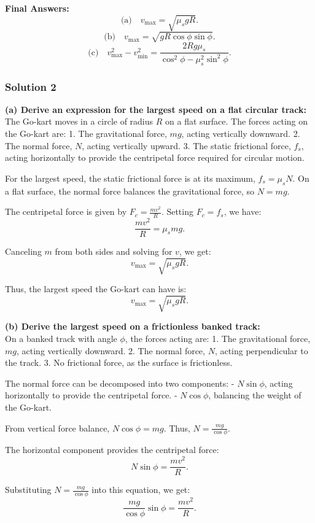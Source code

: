 \documentclass{article}
\begin{document}
\textbf{Final Answers:}
\[
\text{(a)} \quad v_{\text{max}} = \sqrt{\mu_s g R}.
\]
\[
\text{(b)} \quad v_{\text{max}} = \sqrt{g R \cos\phi \sin\phi}.
\]
\[
\text{(c)} \quad v_{\text{max}}^2 - v_{\text{min}}^2 = \frac{2Rg \mu_s}{\cos^2\phi - \mu_s^2 \sin^2\phi}.
\]

\subsubsection{Solution 2}

\textbf{(a) Derive an expression for the largest speed on a flat circular track:} \\[1em]
The Go-kart moves in a circle of radius $R$ on a flat surface. The forces acting on the Go-kart are:
1. The gravitational force, $mg$, acting vertically downward.
2. The normal force, $N$, acting vertically upward.
3. The static frictional force, $f_s$, acting horizontally to provide the centripetal force required for circular motion.

For the largest speed, the static frictional force is at its maximum, $f_s = \mu_s N$. On a flat surface, the normal force balances the gravitational force, so $N = mg$.

The centripetal force is given by $F_c = \frac{mv^2}{R}$. Setting $F_c = f_s$, we have:
\[
\frac{mv^2}{R} = \mu_s mg.
\]

Canceling $m$ from both sides and solving for $v$, we get:
\[
v_{\text{max}} = \sqrt{\mu_s g R}.
\]

Thus, the largest speed the Go-kart can have is:
\[
\boxed{v_{\text{max}} = \sqrt{\mu_s g R}}.
\]

\textbf{(b) Derive the largest speed on a frictionless banked track:} \\[1em]
On a banked track with angle $\phi$, the forces acting are:
1. The gravitational force, $mg$, acting vertically downward.
2. The normal force, $N$, acting perpendicular to the track.
3. No frictional force, as the surface is frictionless.

The normal force can be decomposed into two components:
- $N\sin\phi$, acting horizontally to provide the centripetal force.
- $N\cos\phi$, balancing the weight of the Go-kart.

From vertical force balance, $N\cos\phi = mg$. Thus, $N = \frac{mg}{\cos\phi}$.

The horizontal component provides the centripetal force:
\[
N\sin\phi = \frac{mv^2}{R}.
\]

Substituting $N = \frac{mg}{\cos\phi}$ into this equation, we get:
\[
\frac{mg}{\cos\phi} \sin\phi = \frac{mv^2}{R}.
\]
\end{document}
